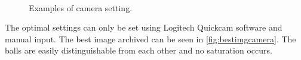 \begin{figure}[H]
\centering
{}
\\

\caption{Examples of camera setting.}
\label{fig:wrongcamera}
\end{figure} 

The optimal settings can only be set using Logitech Quickcam software and manual input. The best image archived can be seen in \ref{fig:bestimgcamera}. The balls are easily distinguishable from each other and no saturation occurs.

